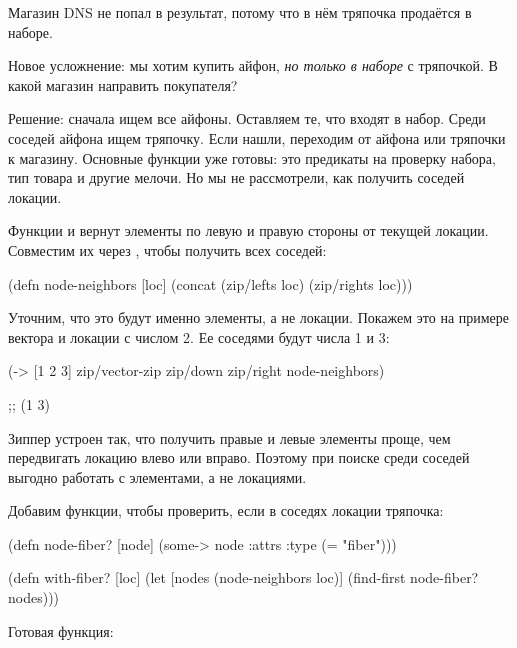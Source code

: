 Магазин DNS не попал в результат, потому что в нём тряпочка продаётся в наборе.

Новое усложнение: мы хотим купить айфон, \emph{но только в наборе} с тряпочкой. В
какой магазин направить покупателя?

Решение: сначала ищем все айфоны. Оставляем те, что входят в набор. Среди
соседей айфона ищем тряпочку. Если нашли, переходим от айфона или тряпочки к
магазину. Основные функции уже готовы: это предикаты на проверку набора, тип
товара и другие мелочи. Но мы не рассмотрели, как получить соседей локации.

Функции  и  вернут элементы по левую и правую
стороны от текущей локации. Совместим их через , чтобы получить
всех соседей:

\begin{english}
  \begin{clojure}
(defn node-neighbors [loc]
  (concat (zip/lefts loc)
          (zip/rights loc)))
  \end{clojure}
\end{english}

Уточним, что это будут именно элементы, а не локации. Покажем это на примере
вектора и локации с числом 2. Ее соседями будут числа 1 и 3:

\begin{english}
  \begin{clojure}
(-> [1 2 3]
    zip/vector-zip
    zip/down
    zip/right
    node-neighbors)

;; (1 3)
  \end{clojure}
\end{english}

Зиппер устроен так, что получить правые и левые элементы проще, чем передвигать
локацию влево или вправо. Поэтому при поиске среди соседей выгодно работать с
элементами, а не локациями.

Добавим функции, чтобы проверить, если в соседях локации тряпочка:

\begin{english}
  \begin{clojure}
(defn node-fiber?
  [node]
  (some-> node :attrs :type (= "fiber")))

(defn with-fiber?
  [loc]
  (let [nodes (node-neighbors loc)]
    (find-first node-fiber? nodes)))
  \end{clojure}
\end{english}

Готовая функция:

